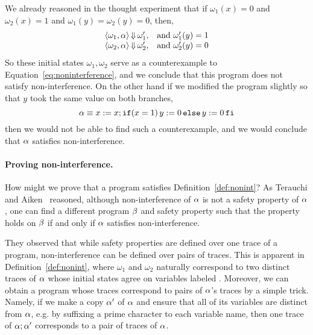 \documentclass[11pt,twoside]{scrartcl}
\begin{document}
We already reasoned in the thought experiment that if $\omega_1(x) = 0$ and $\omega_2(x) = 1$ and $\omega_1(y) = \omega_2(y) = 0$, then,
\[
\begin{array}{ll}
\langle \omega_1, \alpha\rangle \operatorname{\Downarrow} \omega_1', & \text{and}~\omega_1'(y) = 1 \\
\langle \omega_2, \alpha\rangle \operatorname{\Downarrow} \omega_2', & \text{and}~\omega_2'(y) = 0 \\
\end{array}
\]
So these initial states $\omega_1,\omega_2$ serve as a counterexample to Equation~\ref{eq:noninterference}, and we conclude that this program does not satisfy non-interference. On the other hand if we modified the program slightly so that $y$ took the same value on both branches,
\[
\alpha \equiv x := x; \texttt{\upshape if}(x = 1)\,y:=0\,\texttt{\upshape else}\,y:=0\texttt{\upshape \,fi}
\]
then we would not be able to find such a counterexample, and we would conclude that $\alpha$ satisfies non-interference.

\paragraph{Proving non-interference.}
How might we prove that a program satisfies Definition~\ref{def:nonint}? As Terauchi and Aiken~\cite{Terauchi2005} reasoned, although non-interference of $\alpha$ is not a safety property of $\alpha$, one can find a different program $\beta$ and safety property such that the property holds on $\beta$ if and only if $\alpha$ satisfies non-interference.

They observed that while safety properties are defined over one trace of a program, non-interference can be defined over pairs of traces. This is apparent in Definition~\ref{def:nonint}, where $\omega_1$ and $\omega_2$ naturally correspond to two distinct traces of $\alpha$ whose initial states agree on variables labeled \lowsec. Moreover, we can obtain a program whose traces correspond to pairs of $\alpha$'s traces by a simple trick. Namely, if we make a copy $\alpha'$ of $\alpha$ and ensure that all of its variables are distinct from $\alpha$, e.g. by suffixing a prime character to each variable name, then one trace of $\alpha;\alpha'$ corresponds to a pair of traces of $\alpha$.
\end{document}
